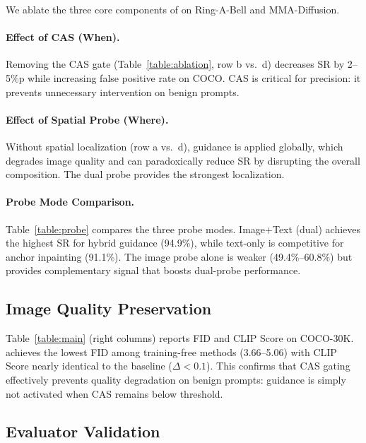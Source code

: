 We ablate the three core components of \ours{} on Ring-A-Bell and MMA-Diffusion.



\paragraph{Effect of CAS (When).}
Removing the CAS gate (Table~\ref{table:ablation}, row b vs.\ d) decreases SR by 2--5\%p while increasing false positive rate on COCO. CAS is critical for precision: it prevents unnecessary intervention on benign prompts.

\paragraph{Effect of Spatial Probe (Where).}
Without spatial localization (row a vs.\ d), guidance is applied globally, which degrades image quality and can paradoxically reduce SR by disrupting the overall composition. The dual probe provides the strongest localization.

\paragraph{Probe Mode Comparison.}
Table~\ref{table:probe} compares the three probe modes. Image+Text (dual) achieves the highest SR for hybrid guidance (94.9\%), while text-only is competitive for anchor inpainting (91.1\%). The image probe alone is weaker (49.4\%--60.8\%) but provides complementary signal that boosts dual-probe performance.



\subsection{Image Quality Preservation}
\label{subsec:quality}

Table~\ref{table:main} (right columns) reports FID and CLIP Score on COCO-30K. \ours{} achieves the lowest FID among training-free methods (3.66--5.06) with CLIP Score nearly identical to the baseline ($\Delta < 0.1$). This confirms that CAS gating effectively prevents quality degradation on benign prompts: guidance is simply not activated when CAS remains below threshold.

\subsection{Evaluator Validation}
\label{subsec:evaluator}

